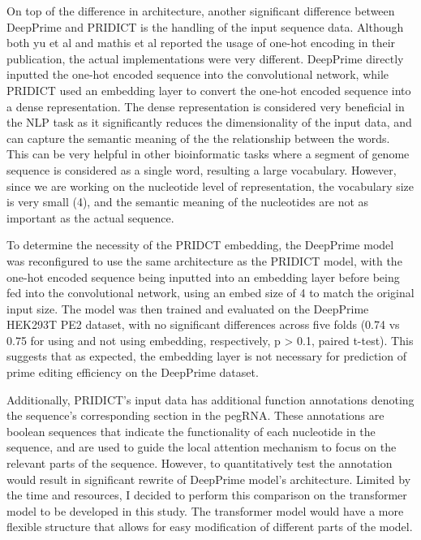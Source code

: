 On top of the difference in architecture, another significant difference between DeepPrime and PRIDICT is the handling of the input sequence data. Although both yu et al and mathis et al reported the usage of one-hot encoding in their publication, the actual implementations were very different. DeepPrime directly inputted the one-hot encoded sequence into the convolutional network, while PRIDICT used an embedding layer to convert the one-hot encoded sequence into a dense representation. The dense representation is considered very beneficial in the NLP task as it significantly reduces the dimensionality of the input data, and can capture the semantic meaning of the the relationship between the words\cite{goldbergPrimerNeuralNetwork2015}. This can be very helpful in other bioinformatic tasks where a segment of genome sequence is considered as a single word, resulting a large vocabulary\cite{cegliaIdentificationTranscriptionalPrograms2023}. However, since we are working on the nucleotide level of representation, the vocabulary size is very small (4), and the semantic meaning of the nucleotides are not as important as the actual sequence. 

To determine the necessity of the PRIDCT embedding, the DeepPrime model was reconfigured to use the same architecture as the PRIDICT model, with the one-hot encoded sequence being inputted into an embedding layer before being fed into the convolutional network, using an embed size of 4 to match the original input size. The model was then trained and evaluated on the DeepPrime HEK293T PE2 dataset, with no significant differences across five folds (0.74 vs 0.75 for using and not using embedding, respectively, p > 0.1, paired t-test). This suggests that as expected, the embedding layer is not necessary for prediction of prime editing efficiency on the DeepPrime dataset.

Additionally, PRIDICT's input data has additional function annotations denoting the sequence's corresponding section in the pegRNA. These annotations are boolean sequences that indicate the functionality of each nucleotide in the sequence, and are used to guide the local attention mechanism to focus on the relevant parts of the sequence. However, to quantitatively test the annotation would result in significant rewrite of DeepPrime model's architecture. Limited by the time and resources, I decided to perform this comparison on the transformer model to be developed in this study. The transformer model would have a more flexible structure that allows for easy modification of different parts of the model. 


